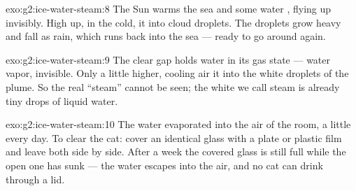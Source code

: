 \begin{solution}{exo:g2:ice-water-steam:8}
The Sun warms the sea and some water , flying up invisibly.
High up, in the cold, it  into cloud droplets. The droplets
grow heavy and fall as rain, which runs back into the sea --- ready
to go around again.
\end{solution}

\begin{solution}{exo:g2:ice-water-steam:9}
The clear gap holds water in its gas state --- water vapor,
invisible. Only a little higher, cooling air  it into the
white droplets of the plume. So the real ``steam'' cannot be seen;
the white we call steam is already tiny drops of liquid water.
\end{solution}

\begin{solution}{exo:g2:ice-water-steam:10}
The water evaporated into the air of the room, a little every day.
To clear the cat: cover an identical glass with a plate or plastic
film and leave both side by side. After a week the covered glass is
still full while the open one has sunk --- the water escapes into
the air, and no cat can drink through a lid.
\end{solution}
